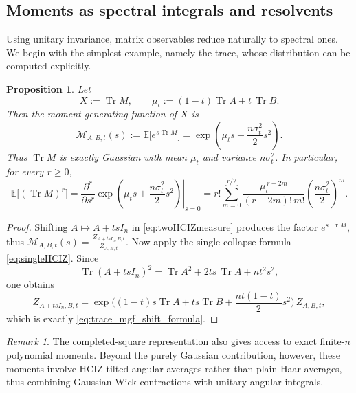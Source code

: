 \documentclass[11pt,a4paper]{article}
\newtheorem{proposition}[theorem]{Proposition}
\theoremstyle{definition}\newtheorem{definition}[theorem]{Definition}
\theoremstyle{remark}\newtheorem{remark}[theorem]{Remark}
\numberwithin{equation}{section}
\DeclareMathOperator{\Tr}{Tr}
\newcommand{\EE}{\mathbb{E}}
\begin{document}
\subsection{Moments as spectral integrals and resolvents}
 

Using unitary invariance, matrix observables reduce naturally to spectral ones. We begin with the simplest example, namely the trace, whose distribution can be computed explicitly. 

 

\begin{proposition}
Let
\begin{equation} 
X:=\Tr M,
\qquad
\mu_t:=(1-t)\Tr A+t\,\Tr B.
\end{equation}
Then the moment generating function of $X$ is
\begin{equation}\label{eq:trace_mgf_shift_formula}
\mathcal M_{A,B,t}(s):=\EE\big[e^{s\Tr M}\big]
= \exp\!\left(\mu_t s+\frac{n\sigma_t^2}{2}s^2\right).
\end{equation}
Thus $\Tr M$ is exactly Gaussian with mean $\mu_t$ and variance $n\sigma_t^2$.
In particular, for every $r\ge 0$,
\begin{equation} 
\EE\big[(\Tr M)^r\big]
=
\left.\frac{\partial^r}{\partial s^r}
\exp\!\left(\mu_t s+\frac{n\sigma_t^2}{2}s^2\right)\right|_{s=0}
=
r!\sum_{m=0}^{\lfloor r/2\rfloor}
\frac{\mu_t^{\,r-2m}}{(r-2m)!\,m!}
\left(\frac{n\sigma_t^2}{2}\right)^m.
\end{equation}
\end{proposition}

\begin{proof}
Shifting $A\mapsto A+t s I_n$ in \eqref{eq:twoHCIZmeasure} produces the factor $e^{s\Tr M}$, thus $\mathcal M_{A,B,t}(s)=\frac{Z_{A+t s I_n,B,t}}{Z_{A,B,t}}$.  Now apply the single-collapse formula \eqref{eq:singleHCIZ}. Since
\begin{equation}
\Tr(A+t s I_n)^2=\Tr A^2+2ts\,\Tr A+n t^2 s^2,
\end{equation}
one obtains
\begin{equation}
Z_{A+t s I_n,B,t}
=
\exp\!\Big((1-t)s\Tr A+t s\Tr B+\frac{n t(1-t)}{2}s^2\Big)\,Z_{A,B,t},
\end{equation}
which is exactly \eqref{eq:trace_mgf_shift_formula}.
\end{proof}

\begin{remark}
The completed-square representation also gives access to exact finite-$n$ polynomial moments. Beyond the purely Gaussian contribution, however, these moments involve HCIZ-tilted angular averages rather than plain Haar averages, thus combining Gaussian Wick contractions with unitary angular integrals.
\end{remark}
\end{document}
